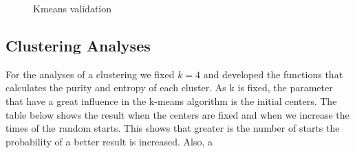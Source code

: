\documentclass[a4paper,11pt]{article}
\begin{document}
\begin{figure}[ht!]
\begin{centering}
{    }
  \end{centering}
  \caption{Kmeans validation}
  \label{fig:val}
\end{figure}

\subsection{Clustering Analyses}

For the  analyses of a clustering  we fixed $k  = 4$ and developed  the functions
that calculates the purity and entropy of each cluster. As k is fixed, the 
parameter that  have a great influence  in the k-means algorithm  is the initial
centers. The table below shows the result when the centers are fixed and when we
increase the times  of the random starts. This shows that  greater is the number
of starts the probability of a better result is increased. Also, a 
\end{document}
